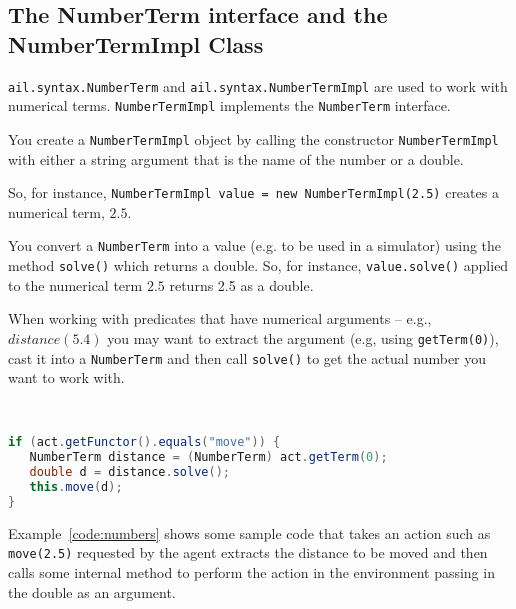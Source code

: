 \subsection{The NumberTerm interface and the NumberTermImpl Class}
\texttt{ail.syntax.NumberTerm} and \texttt{ail.syntax.NumberTermImpl} are used to work with numerical terms.  \texttt{NumberTermImpl} implements the \texttt{NumberTerm} interface. 
\begin{itemize}
\begin{sloppypar}
\item You create a \texttt{NumberTermImpl} object by calling the constructor \texttt{NumberTermImpl} with either a string argument that is the name of the number or a double.

So, for instance, \texttt{NumberTermImpl value = new NumberTermImpl(2.5)} creates a numerical term, $2.5$.
\end{sloppypar}
\item You convert a \texttt{NumberTerm} into a value (e.g. to be used in a simulator) using the method \texttt{solve()} which returns a double.  So, for instance, \texttt{value.solve()} applied to the numerical term $2.5$ returns 2.5 as a double.

\begin{sloppypar}
When working with predicates that have numerical arguments -- e.g., $distance(5.4)$ you may want to extract the argument (e.g, using \texttt{getTerm(0)}), cast it into a \texttt{NumberTerm} and then call \texttt{solve()} to get the actual number you want to work with.
\end{sloppypar}
\begin{ourexample}
\label{code:numbers} \quad \\
\begin{lstlisting}[basicstyle=\sffamily,language=Java,style=easslisting]
if (act.getFunctor().equals("move")) {
   NumberTerm distance = (NumberTerm) act.getTerm(0);
   double d = distance.solve();
   this.move(d);
}
\end{lstlisting}
\end{ourexample}
\end{itemize}
Example~\ref{code:numbers} shows some sample code that takes an action such as \texttt{move(2.5)} requested by the agent extracts the distance to be moved and then calls some internal method to perform the action in the environment passing in the double as an argument.

